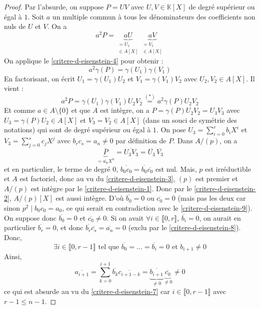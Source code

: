   \begin{proof}
    Par l'absurde, on suppose $P = UV$ avec $U, V \in \mathbb{K}[X]$ de degré supérieur ou égal à $1$. Soit $a$ un multiple commun à tous les dénominateurs des coefficients non nuls de $U$ et $V$. On a
    \[ a^2 P = \underbrace{a U}_{\substack{= U_1 \\ \in A[X]}} \underbrace{a V}_{\substack{= V_1 \\ \in A[X]}} \]
    On applique le \cref{critere-d-eisenstein-4} pour obtenir :
    \[ a^2 \gamma(P) = \gamma(U_1) \gamma(V_1) \tag{$*$} \]
    En factorisant, on écrit $U_1 = \gamma(U_1) U_2$ et $V_1 = \gamma(V_1) V_2$ avec $U_2, V_2 \in A[X]$. Il vient :
    \[ a^2 P = \gamma(U_1) \gamma(V_1) U_2 V_2 \overset{(*)}{=} a^2 \gamma(P) U_2 V_2 \]
    Et comme $a \in A \setminus \{ 0 \}$ et que $A$ est intègre, on a $P = \gamma(P) U_2 V_2 = U_3 V_3$ avec $U_3 = \gamma(P) U_2 \in A[X]$ et $V_3 = V_2 \in A[X]$ (dans un souci de symétrie des notations) qui sont de degré supérieur ou égal à $1$.
    \newpar
    On pose $U_3 = \sum_{i=0}^r b_i X^i$ et $V_3 = \sum_{j=0}^s c_j X^j$ avec $b_r c_s = a_n \neq 0$ par définition de $P$. Dans $A/(p)$, on a
    \[ \underbrace{\overline{P}}_{= \overline{a_n} X^n} = \overline{U_3 V_3} = \overline{U_3} \, \overline{V_3} \]
    et en particulier, le terme de degré $0$, $\overline{b_0 c_0} = \overline{b_0} \overline{c_0}$ est nul. Mais, $p$ est irréductible et $A$ est factoriel, donc au vu du \cref{critere-d-eisenstein-3}, $(p)$ est premier et $A/(p)$ est intègre par le \cref{critere-d-eisenstein-1}. Donc par le \cref{critere-d-eisenstein-2}, $A/(p)[X]$ est aussi intègre. D'où $\overline{b_0} = 0$ ou $\overline{c_0} = 0$ (mais pas les deux car sinon $p^2 \mid b_0 c_0 = a_0$, ce qui serait en contradiction avec le \cref{critere-d-eisenstein-9}).
    \newpar
    On suppose donc $\overline{b_0} = 0$ et $\overline{c_0} \neq 0$. Si on avait $\forall i \in \llbracket 0, r \rrbracket$, $\overline{b_i} = 0$, on aurait en particulier $\overline{b_r} = 0$, et donc $\overline{b_r} \overline{c_s} = \overline{a_n} = 0$ (exclu par le \cref{critere-d-eisenstein-8}). Donc,
    \[ \exists i \in \llbracket 0, r-1 \rrbracket \text{ tel que } \overline{b_0} = \dots = \overline{b_i} = 0 \text{ et } b_{i+1} \neq 0 \]
    Ainsi,
    \[ \overline{a_{i+1}} = \sum_{k=0}^{i+1} \overline{b_k} \overline{c_{i+1-k}} = \underbrace{\overline{b_{i+1}}}_{\neq 0} \underbrace{\overline{c_0}}_{\neq 0} \neq 0 \]
    ce qui est absurde au vu du \cref{critere-d-eisenstein-7} car $i \in \llbracket 0, r-1 \rrbracket$ avec $r-1 \leq n-1$.
  \end{proof}


